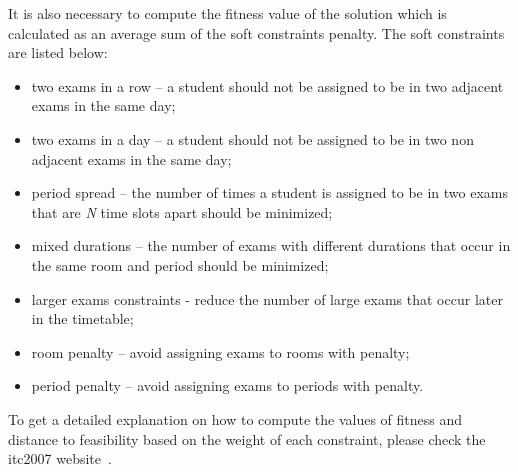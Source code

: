 It is also necessary to compute the fitness value of the solution which is calculated as an average sum of the soft constraints penalty. The soft constraints are listed below:
\begin{itemize}
	\item two exams in a row -- a student should not be assigned to be in two adjacent exams in the same day;
	\item two exams in a day -- a student should not be assigned to be in two non adjacent exams in the same day;
	\item period spread -- the number of times a student is assigned to be in two exams that are \textit{N} time slots apart should be minimized;
	\item mixed durations -- the number of exams with different durations that occur in the same room and period should be minimized;
	\item larger exams constraints - reduce the number of large exams that occur later in the timetable;
	\item room penalty -- avoid assigning exams to rooms with penalty;
	\item period penalty -- avoid assigning exams to periods with penalty.
\end{itemize}

To get a detailed explanation on how to compute the values of fitness and distance to feasibility based on the weight of each constraint, please check the \gls{itc2007} website~\cite{McCollum2007}.\\


